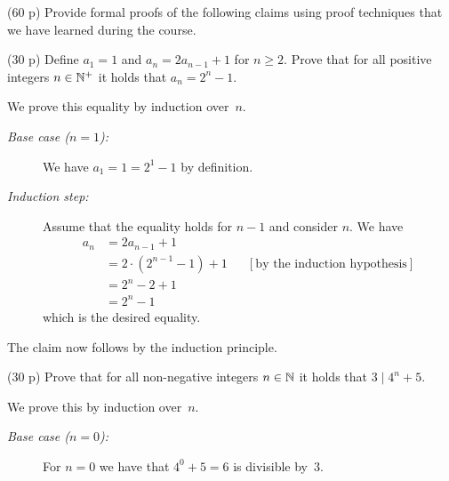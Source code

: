 \documentclass{jn-pset}
\begin{document}
\begin{problem}
  (60 p)
  Provide formal proofs of the following claims
  using proof techniques that we have learned during the course.


  \begin{subproblem}%
    {(30 p)}
    {\ignorespaces}
    Define
    $a_1 = 1$
    and
    $a_n = 2 a_{n-1} + 1$
    for
    $n \geq 2$.
    Prove that for all positive integers
    $n \in \mathbb{N}^{+}$
    it holds that 
    $a_n = 2^n - 1$.
  \end{subproblem}

\begin{solution}
We prove this equality by induction over~$n$.

\begin{description}
\item[\emph{Base case ($n=1$):}]
  We have
  $a_1 = 1 = 2^1 - 1$
  by definition.

\item[\emph{Induction step:}]
  Assume that the equality holds for $n-1$ and consider $n$.
  We have
  \begin{align*}
    a_n &= 2 a_{n-1} + 1
    \\                           
    &= 2 \cdot (2 ^{n-1} - 1) + 1
    &&[\text{by the induction hypothesis}]
    \\
    &= 2 ^{n} - 2 + 1    
    \\
    &= 2 ^{n} - 1
  \end{align*}
  which is the desired equality.
\end{description}
The claim now follows by the induction principle.  
\end{solution}


\begin{subproblem}%
  {(30 p)}
  {\ignorespaces}
  Prove that for all non-negative integers
  $n \in \mathbb{N}$
  it holds that
  $
  3 \mid 4^n + 5 
  $.
\end{subproblem}

\begin{solution}
  We prove this by 
  induction over~$n$.
  \begin{description}
  \item[\emph{Base case ($n=0$):}]
    For $n=0$ we have that
    $
    4^0 + 5 
    =
    6
    $
    is divisible by~$3$.
    

\end{description}
\end{solution}
\end{problem}
\end{document}
